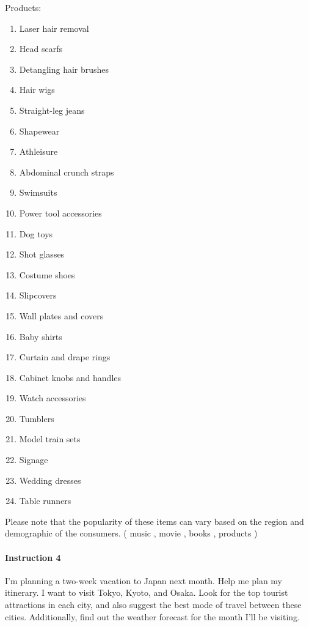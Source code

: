 Products:
\begin{enumerate}[noitemsep,topsep=0pt,parsep=0pt,partopsep=0pt,leftmargin=2em]
    \item Laser hair removal
    \item Head scarfs
    \item Detangling hair brushes
    \item Hair wigs
    \item Straight-leg jeans
    \item Shapewear
    \item Athleisure
    \item Abdominal crunch straps
    \item Swimsuits
    \item  Power tool accessories
    \item  Dog toys
    \item  Shot glasses
    \item  Costume shoes
    \item  Slipcovers
    \item  Wall plates and covers
    \item  Baby shirts
    \item  Curtain and drape rings
    \item  Cabinet knobs and handles
    \item  Watch accessories
    \item  Tumblers
    \item  Model train sets
    \item  Signage
    \item  Wedding dresses
    \item  Table runners
\end{enumerate}

Please note that the popularity of these items can vary based on the region and demographic of the consumers. ({\color{teal} music \cmark}, {\color{teal} movie \cmark}, {\color{teal} books \cmark}, {\color{teal} products \cmark})

\paragraph{Instruction 4} I'm planning a two-week vacation to Japan next month. Help me plan my itinerary. I want to visit Tokyo, Kyoto, and Osaka. Look for the top tourist attractions in each city, and also suggest the best mode of travel between these cities. Additionally, find out the weather forecast for the month I'll be visiting.

